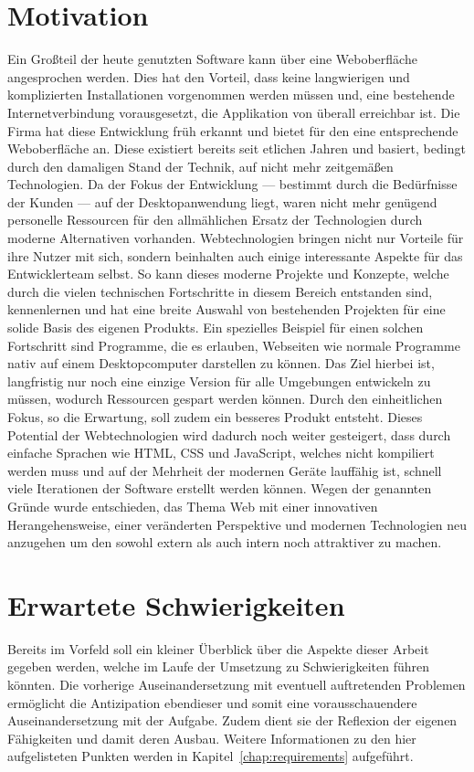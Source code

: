 \section{Motivation}
Ein Großteil der heute genutzten Software kann über eine Weboberfläche angesprochen werden. Dies hat den Vorteil, dass keine langwierigen und komplizierten Installationen vorgenommen werden müssen und, eine bestehende Internetverbindung vorausgesetzt, die Applikation von überall erreichbar ist. Die Firma  hat diese Entwicklung früh erkannt und bietet für den  eine entsprechende Weboberfläche an. Diese existiert bereits seit etlichen Jahren und basiert, bedingt durch den damaligen Stand der Technik, auf nicht mehr zeitgemäßen Technologien. Da der Fokus der Entwicklung --- bestimmt durch die Bedürfnisse der Kunden --- auf der Desktopanwendung liegt, waren nicht mehr genügend personelle Ressourcen für den allmählichen Ersatz der Technologien durch moderne Alternativen vorhanden.
Webtechnologien bringen nicht nur Vorteile für ihre Nutzer mit sich, sondern beinhalten auch einige interessante Aspekte für das Entwicklerteam selbst. So kann dieses moderne Projekte und Konzepte, welche durch die vielen technischen Fortschritte in diesem Bereich entstanden sind, kennenlernen und hat eine breite Auswahl von bestehenden Projekten für eine solide Basis des eigenen Produkts. Ein spezielles Beispiel für einen solchen Fortschritt sind Programme, die es erlauben, Webseiten wie normale Programme nativ auf einem Desktopcomputer darstellen zu können. Das Ziel hierbei ist, langfristig nur noch eine einzige Version für alle Umgebungen entwickeln zu müssen, wodurch Ressourcen gespart werden können. Durch den einheitlichen Fokus, so die Erwartung, soll zudem ein besseres Produkt entsteht. Dieses Potential der Webtechnologien wird dadurch noch weiter gesteigert, dass durch einfache Sprachen wie HTML, CSS und JavaScript, welches nicht kompiliert werden muss und auf der Mehrheit der modernen Geräte lauffähig ist, schnell viele Iterationen der Software erstellt werden können.
Wegen der genannten Gründe wurde entschieden, das Thema Web mit einer innovativen Herangehensweise, einer veränderten Perspektive und modernen Technologien neu anzugehen um den  sowohl extern als auch intern noch attraktiver zu machen.

\section{Erwartete Schwierigkeiten}
Bereits im Vorfeld soll ein kleiner Überblick über die Aspekte dieser Arbeit gegeben werden, welche im Laufe der Umsetzung zu Schwierigkeiten führen könnten. Die vorherige Auseinandersetzung mit eventuell auftretenden Problemen ermöglicht die Antizipation ebendieser und somit eine vorausschauendere Auseinandersetzung mit der Aufgabe. Zudem dient sie der Reflexion der eigenen Fähigkeiten und damit deren Ausbau. Weitere Informationen zu den hier aufgelisteten Punkten werden in Kapitel~\ref{chap:requirements} aufgeführt.

